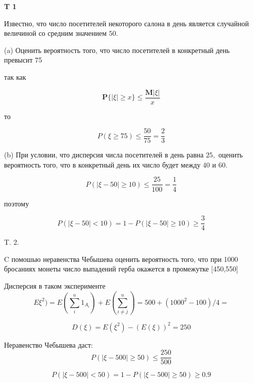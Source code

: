 \documentclass[a4paper,12pt]{article} %
\begin{document}
\begin{example}\textbf{T 1}

Известно, что число посетителей некоторого салона в день является случайной величиной со средним значением $50 .$

(a) Оценить вероятность того, что число посетителей в конкретный день превысит 75


так как

$$
\mathbf{P}\{|\xi| \geqslant x\} \leqslant \frac{\mathbf{M}|\xi|}{x}
$$

то


$$
P(\xi \geq 75) \leq \frac{50}{75}=\frac{2}{3}
$$



(b) При условии, что дисперсия числа посетителей в день равна $25,$ 
оценить вероятность того, что в конкретный день их число будет между 40 и $60 .$


$$
P(|\xi-50| \geq 10) \leq \frac{25}{100}=\frac{1}{4} 
$$

поэтому

\[  
P(|\xi-50|<10)=1-P(|\xi-50| \geq 10) \geq \frac{3}{4} 
\]




\end{example}



\begin{example} T. 2. 


$\mathrm{C}$ помошью неравенства Чебышева оценить вероятность того, что при 1000 бросаниях монеты число выпадений герба окажется в промежутке [450,550]





Дисперсия в таком эксперименте
$$
E\xi^2)=E(\sum_{i}^{n}1_{A_i})+E(\sum_{i\ne j}^{n})=500+(1000^2-100)/4=
$$



\[ D(\xi)=E(\xi^2)-(E(\xi))^2=250 \]

Неравенство Чебышева даст:
$$
P(|\xi-500| \geq 50) \leq \frac{250}{500}  $$



\[ P(|\xi-500|<50)=1-P(|\xi-500| \geq 50) \geq
0.9
 \]




\end{example}
\end{document}
